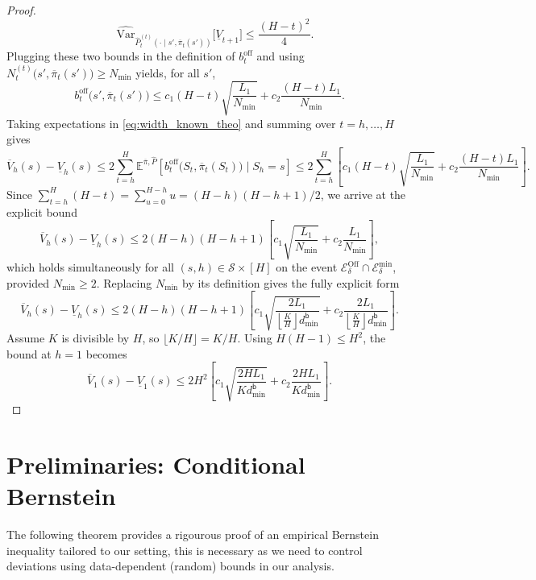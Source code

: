 \documentclass[twoside]{article}
\newcommand{\off}{\mathrm{off}} %
\newcommand{\boffp}[1]{b_{#1}^{\off}} %
\newcommand{\ohighv}{\overline{V}} %
\newcommand{\olowv}{\underline{V}} %
\begin{document}
\begin{proof}
\[\quad
\widehat{\mathrm{Var}}_{\widehat{P}^{(t)}_t(\cdot\mid s',\overline{\pi}_t(s'))}\big[\olowv_{t+1}\big]\le \dfrac{(H-t)^2}{4}.
\]
Plugging these two bounds in the definition of $\boffp{t}$ and using $N_t^{(t)}\big(s',\overline{\pi}_t(s')\big)\ge N_{\min}$ yields, for all $s'$,
\[
\boffp{t}\big(s',\overline{\pi}_t(s')\big)
\le
c_1(H-t)\sqrt{\frac{L_1}{N_{\min}}}+c_2\frac{(H-t)L_1}{N_{\min}}.
\]
Taking expectations in \eqref{eq:width_known_theo} and summing over $t=h,\dots,H$ gives
\[
\ohighv_h(s)-\olowv_h(s)
\le
2\sum_{t=h}^{H}\mathbb{E}^{\overline{\pi},\widehat{P}}\left[\boffp{t}\big(S_t,\overline{\pi}_t(S_t)\big)\mid S_h=s\right]
\le
2\sum_{t=h}^{H}\left[c_1(H-t)\sqrt{\frac{L_1}{N_{\min}}}+c_2\frac{(H-t)L_1}{N_{\min}}\right].
\]
Since $\sum_{t=h}^{H}(H-t)=\sum_{u=0}^{H-h}u=(H-h)(H-h+1)/2$, we arrive at the explicit bound
\begin{equation}
\label{eq:width_known_real}
\ohighv_h(s)-\olowv_h(s)
\le
2(H-h)(H-h+1)\left[
c_1\sqrt{\frac{L_1}{N_{\min}}}+c_2\frac{L_1}{N_{\min}}
\right],
\end{equation}
which holds simultaneously for all $(s,h)\in\mathcal{S}\times[H]$ on the event $\mathcal{E}^{\mathrm{Off}}_\delta\cap\mathcal{E}^{\mathrm{min}}_\delta$, provided $N_{\min}\ge 2$. Replacing $N_{\min}$ by its definition gives the fully explicit form
\[
\ohighv_h(s)-\olowv_h(s)
\le
2(H-h)(H-h+1)\left[
c_1\sqrt{\frac{2L_1}{\left\lfloor\tfrac{K}{H}\right\rfloor d^{\mathsf{b}}_{\min}}}+c_2\frac{2L_1}{\left\lfloor\tfrac{K}{H}\right\rfloor d^{\mathsf{b}}_{\min}}
\right].
\]
Assume \(K\) is divisible by \(H\), so \(\lfloor K/H \rfloor = K/H\). Using \(H(H-1) \le H^2\), the bound at \(h=1\) becomes
\[
\ohighv_1(s) - \olowv_1(s)
\le
2H^2\left[
c_1\sqrt{\frac{2HL_1}{Kd^{\mathsf{b}}_{\min}}}+c_2\frac{2HL_1}{K d^{\mathsf{b}}_{\min}}
\right].
\]
\end{proof}

 
\section{Preliminaries: Conditional Bernstein}
\label{sec:cond_bernstein}
The following theorem provides a rigourous proof of an empirical Bernstein inequality tailored to our setting, this is necessary as we need to control deviations using data-dependent (random) bounds in our analysis.
\end{document}
